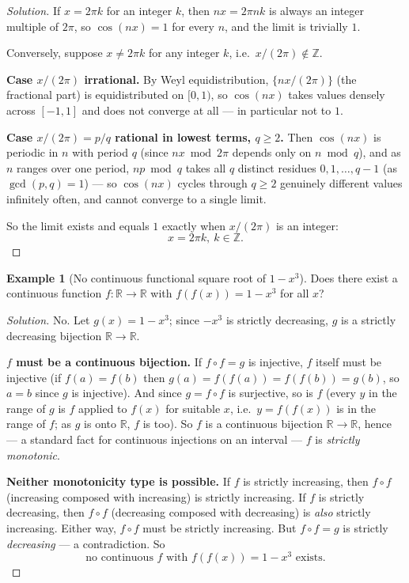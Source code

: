 \documentclass[11pt]{article}
\theoremstyle{definition}
\newtheorem{example}{Example}[section]
\newcommand{\R}{\mathbb{R}}
\newcommand{\Z}{\mathbb{Z}}
\begin{document}
\begin{proof}[Solution]
If $x=2\pi k$ for an integer $k$, then $nx=2\pi nk$ is always an integer multiple of $2\pi$, so $\cos(nx)=1$ for every $n$, and the limit is trivially $1$.

Conversely, suppose $x\neq2\pi k$ for any integer $k$, i.e.\ $x/(2\pi)\notin\Z$.

\textbf{Case $x/(2\pi)$ irrational.} By Weyl equidistribution, $\{nx/(2\pi)\}$ (the fractional part) is equidistributed on $[0,1)$, so $\cos(nx)$ takes values densely across $[-1,1]$ and does not converge at all — in particular not to $1$.

\textbf{Case $x/(2\pi)=p/q$ rational in lowest terms, $q\ge2$.} Then $\cos(nx)$ is periodic in $n$ with period $q$ (since $nx \bmod 2\pi$ depends only on $n\bmod q$), and as $n$ ranges over one period, $np\bmod q$ takes all $q$ distinct residues $0,1,\dots,q-1$ (as $\gcd(p,q)=1$) — so $\cos(nx)$ cycles through $q\ge2$ genuinely different values infinitely often, and cannot converge to a single limit.

So the limit exists and equals $1$ exactly when $x/(2\pi)$ is an integer:
\[
\boxed{x=2\pi k,\ k\in\Z}.
\]
\end{proof}

\begin{example}[No continuous functional square root of $1-x^3$]
Does there exist a continuous function $f:\R\to\R$ with $f(f(x))=1-x^3$ for all $x$?
\end{example}

\begin{proof}[Solution]
No. Let $g(x)=1-x^3$; since $-x^3$ is strictly decreasing, $g$ is a strictly decreasing bijection $\R\to\R$.

\textbf{$f$ must be a continuous bijection.} If $f\circ f=g$ is injective, $f$ itself must be injective (if $f(a)=f(b)$ then $g(a)=f(f(a))=f(f(b))=g(b)$, so $a=b$ since $g$ is injective). And since $g=f\circ f$ is surjective, so is $f$ (every $y$ in the range of $g$ is $f$ applied to $f(x)$ for suitable $x$, i.e.\ $y=f(f(x))$ is in the range of $f$; as $g$ is onto $\R$, $f$ is too). So $f$ is a continuous bijection $\R\to\R$, hence — a standard fact for continuous injections on an interval — $f$ is \emph{strictly monotonic}.

\textbf{Neither monotonicity type is possible.} If $f$ is strictly increasing, then $f\circ f$ (increasing composed with increasing) is strictly increasing. If $f$ is strictly decreasing, then $f\circ f$ (decreasing composed with decreasing) is \emph{also} strictly increasing. Either way, $f\circ f$ must be strictly increasing. But $f\circ f=g$ is strictly \emph{decreasing} — a contradiction. So
\[
\boxed{\text{no continuous } f \text{ with } f(f(x))=1-x^3 \text{ exists}}.
\]
\end{proof}
\end{document}
